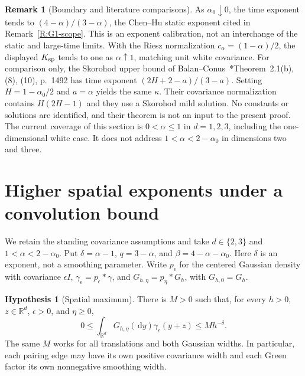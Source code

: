 \documentclass[12pt]{article}
\numberwithin{equation}{section}
\theoremstyle{definition}
\newtheorem{hypothesis}[theorem]{Hypothesis}
\newtheorem{remark}[theorem]{Remark}
\newcommand{\R}{\mathbb{R}}
\newcommand{\ud}{\,\mathrm{d}}
\begin{document}
\begin{remark}[Boundary and literature comparisons]\label{R:d1-comparisons}
  As $\alpha_0\downarrow0$, the time exponent tends to
  $(4-\alpha)/(3-\alpha)$, the Chen--Hu static exponent cited in
  Remark~\ref{R:G1-scope}. This is an exponent calibration, not an
  interchange of the static and large-time limits. With the Riesz
  normalization $c_\alpha=(1-\alpha)/2$, the displayed $K_{\rm sp}$
  tends to one as $\alpha\uparrow1$, matching unit white covariance.
  For comparison only, the Skorohod upper bound of
  Balan--Conus~\cite{balan.conus:16:intermittency}*{Theorem~2.1(b),
  (8), (10), p.~1492} has time exponent $(2H+2-a)/(3-a)$.
  Setting $H=1-\alpha_0/2$ and $a=\alpha$ yields the same $\kappa$.
  Their covariance normalization contains $H(2H-1)$ and they use a
  Skorohod mild solution. No constants or solutions are identified,
  and their theorem is not an input to the present proof. The current
  coverage of this section is $0<\alpha\le1$ in $d=1,2,3$, including
  the one-dimensional white case. It does not address
  $1<\alpha<2-\alpha_0$ in dimensions two and three.
\end{remark}

\section{Higher spatial exponents under a convolution bound}
\label{S:higher-alpha}


We retain the standing covariance assumptions and take $d\in\{2,3\}$ and
$1<\alpha<2-\alpha_0$. Put $\delta=\alpha-1$, $q=3-\alpha$, and
$\beta=4-\alpha-\alpha_0$. Here $\delta$ is an exponent, not a smoothing
parameter. Write $p_\epsilon$ for the centered Gaussian density with
covariance $\epsilon I$, $\gamma_\epsilon=p_\epsilon*\gamma$, and
$G_{h,\eta}=p_\eta*G_h$, with $G_{h,0}=G_h$.

\begin{hypothesis}[Spatial maximum]\label{H:spatial-maximum}
  There is $M>0$ such that, for every $h>0$, $z\in\R^d$,
  $\epsilon>0$, and $\eta\ge0$,
  \begin{equation}\label{E:higher-convolution}
    0\le\int_{\R^d}G_{h,\eta}(\ud y)\gamma_\epsilon(y+z)
    \le M h^{-\delta}.
  \end{equation}
  The same $M$ works for all translations and both Gaussian widths.
  In particular, each pairing edge may have its own positive covariance
  width and each Green factor its own nonnegative smoothing width.
\end{hypothesis}
\end{document}
